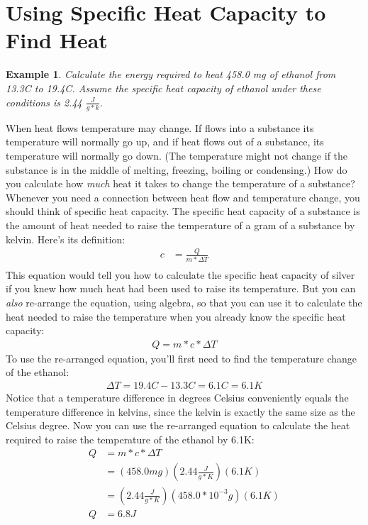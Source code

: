\documentclass{article}  %
\newtheorem{exmp}{Example}
\begin{document}
\section*{Using Specific Heat Capacity to Find Heat}
\begin{exmp}
    Calculate the energy required to heat 458.0 mg of ethanol from 13.3C to 19.4C. Assume the specific heat capacity of ethanol under these conditions is 2.44 $\frac{J}{g*k}$.
\end{exmp}
When heat flows temperature may change. If flows into a substance its temperature will normally go up, and if heat flows out of a substance, its temperature will normally go down. (The temperature might not change if the substance is in the middle of melting, freezing, boiling or condensing.) 
\newline
How do you calculate how \emph{much} heat it takes to change the temperature of a substance? Whenever you need a connection between heat flow and temperature change, you should think of specific heat capacity. The specific heat capacity of a substance is the amount of heat needed to raise the temperature of a gram of a substance by kelvin. Here's its definition: 
\begin{equation*}
    \begin{aligned}
        c &= \frac{Q}{m*\Delta T} \\
    \end{aligned}
\end{equation*}
This equation would tell you how to calculate the specific heat capacity of silver if you knew how much heat had been used to raise its temperature. But you can \emph{also} re-arrange the equation, using algebra, so that you can use it to calculate the heat needed to raise the temperature when you already know the specific heat capacity:  
\begin{equation*}
    \begin{aligned}
        Q = m * c * \Delta T
    \end{aligned}
\end{equation*}
To use the re-arranged equation, you'll first need to find the temperature change of the ethanol: 
\begin{equation*}
    \begin{aligned}
        \Delta T = 19.4C - 13.3C = 6.1C = 6.1K
    \end{aligned}
\end{equation*}
Notice that a temperature difference in degrees Celsius conveniently equals the temperature difference in kelvins, since the kelvin is exactly the same size as the Celsius degree.
Now you can use the re-arranged equation to calculate the heat required to raise the temperature of the ethanol by 6.1K: 
\begin{equation*}
    \begin{aligned}
        Q &= m * c * \Delta T \\
        &= (458.0 mg)(2.44 \frac{J}{g*K})(6.1K) \\
        &= (2.44 \frac{J}{g*K})(458.0 *10^{-3}g)(6.1K) \\
        Q &= 6.8J
    \end{aligned}
\end{equation*}
\end{document}
